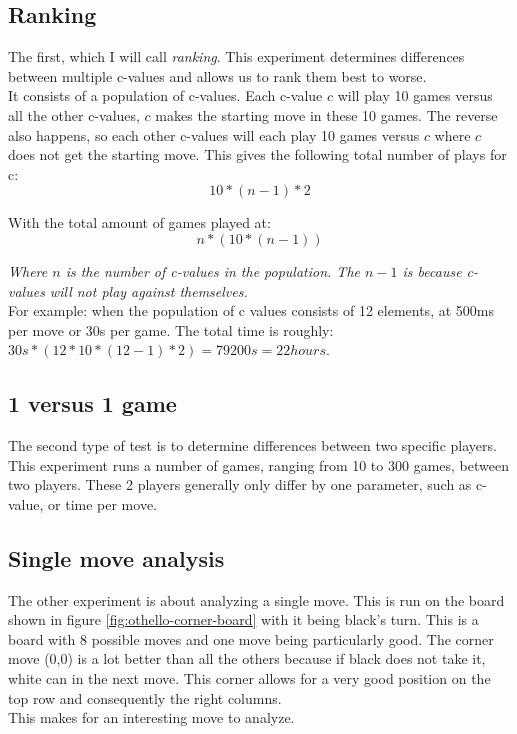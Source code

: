 \documentclass[
11pt, %
english, %
singlespacing, %
headsepline, %
]{MastersDoctoralThesis} %
\begin{document}
\subsection{Ranking}
\label{section:ranking}
The first, which I will call \textit{ranking}. This experiment determines differences between multiple c-values and allows us to rank them best to worse.\\

It consists of a population of c-values. Each c-value $c$ will play 10 games versus all the other c-values, $c$ makes the starting move in these 10 games. The reverse also happens, so each other c-values will each play 10 games versus $c$ where $c$ does not get the starting move. This gives the following total number of plays for c:
\[
   10 * (n-1) * 2
\]

With the total amount of games played at: 
\[
   n * (10 * (n-1))
\]

\textit{Where $n$ is the number of c-values in the population. The $n-1$ is because c-values will not play against themselves.}\\

For example: when the population of c values consists of 12 elements, at 500ms per move or 30s per game. The total time is roughly: $30s * (12 * 10 * (12-1) * 2) =  79200s = 22 hours$.

\subsection{1 versus 1 game}
The second type of test is to determine differences between two specific players. This experiment runs a number of games, ranging from 10 to 300 games, between two players. These 2 players generally only differ by one parameter, such as c-value, or time per move.
\subsection{Single move analysis}
The other experiment is about analyzing a single move. This is run on the board shown in figure \ref{fig:othello-corner-board} with it being black's turn. This is a board with 8 possible moves and one move being particularly good. The corner move (0,0) is a lot better than all the others because if black does not take it, white can in the next move. This corner allows for a very good position on the top row and consequently the right columns.\\

This makes for an interesting move to analyze.
\end{document}

